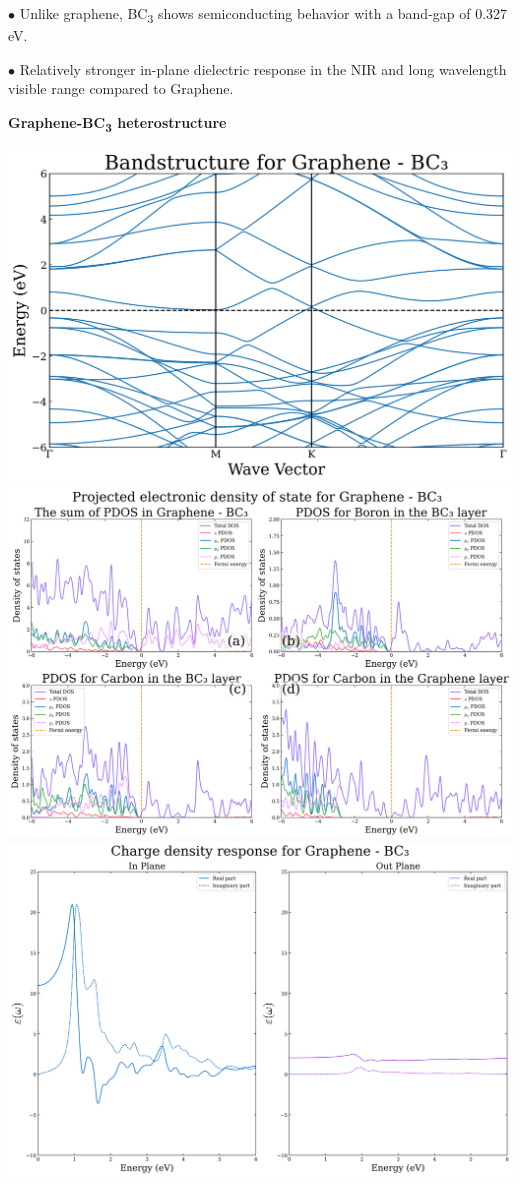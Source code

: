 \documentclass[a0paper,portrait]{baposter}
\begin{document}
\begin{poster}
{\vspace{0pt}\begin{minipage}{1\linewidth}\begin{center}\footnotesize
    \begin{tcolorbox}[colback=table_color_2, colframe=table_color_2, rounded corners, boxsep=2pt, left=0pt, right=0pt, top=0pt, bottom=0pt]
        \par $\bullet$ Unlike graphene, BC\textsubscript{3} shows semiconducting behavior with a band-gap of 0.327 eV.
        \par $\bullet$ Relatively stronger in-plane dielectric response in the NIR and long wavelength visible range compared to Graphene.
    \end{tcolorbox}
\end{center}\end{minipage}

\begin{center}\small\textbf{Graphene-BC\textsubscript{3} heterostructure}\end{center}

\begin{minipage}[t]{1\linewidth}\begin{center}
    \includegraphics[width=0.30\linewidth]{poster_figures/G-BC3_BS.pdf}
    \includegraphics[width=0.30\linewidth]{poster_figures/G-BC3_PDOS.pdf}
    \includegraphics[width=0.30\linewidth]{poster_figures/G-BC3_opt.pdf}
\end{center}\end{minipage}

}
\end{poster}
\end{document}
